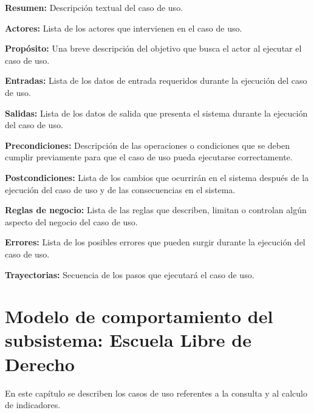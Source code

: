 \documentclass[10pt]{book}
\begin{document}
     \begin{objetivos}
  \item {\bf Resumen:} Descripción textual del caso de uso.
  \item {\bf Actores:} Lista de los actores que intervienen en el caso de uso.
  \item {\bf Propósito:} Una breve descripción del objetivo que busca el actor al ejecutar el caso de uso.
  \item {\bf Entradas:} Lista de los datos de entrada requeridos durante la ejecución del caso de uso.
  \item {\bf Salidas:} Lista de los datos de salida que presenta el sistema durante la ejecución del caso de uso.
  \item {\bf Precondiciones:} Descripción de las operaciones o condiciones que se deben cumplir previamente para que el caso de uso pueda ejecutarse correctamente.
  \item {\bf Postcondiciones:} Lista de los cambios que ocurrirán en el sistema después de la ejecución del caso de uso y de las consecuencias en el sistema.
  \item {\bf Reglas de negocio:} Lista de las reglas que describen, limitan o controlan algún aspecto del negocio del caso de uso.
  \item {\bf Errores:} Lista de los posibles errores que pueden surgir durante la ejecución del caso de uso.
  \item {\bf Trayectorias:} Secuencia de los pasos que ejecutará el caso de uso.
    \end{objetivos}     
    


\chapter{Modelo de comportamiento del subsistema: Escuela Libre de Derecho \label{chp:ELD}}

En este capítulo se describen los casos de uso referentes a la consulta y al calculo de indicadores. \bigskip
\end{document}
